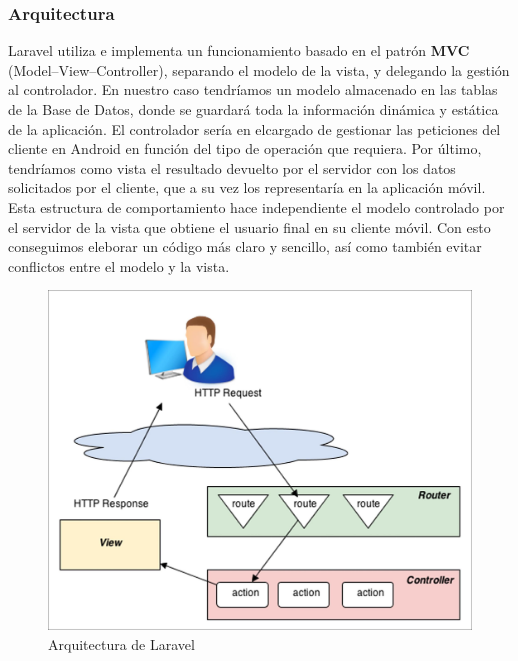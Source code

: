 \subsubsection{Arquitectura}

Laravel utiliza e implementa un funcionamiento basado en el patrón \textbf{MVC} (Model–View–Controller), separando el modelo de la vista, y delegando la gestión al controlador. En nuestro caso tendríamos un modelo almacenado en las tablas de la Base de Datos, donde se guardará toda la información dinámica y estática de la aplicación. El controlador sería en elcargado de gestionar las peticiones del cliente en Android en función del tipo de operación que requiera. Por último, tendríamos como vista el resultado devuelto por el servidor con los datos solicitados por el cliente, que a su vez los representaría en la aplicación móvil. Esta estructura de comportamiento hace independiente el modelo controlado por el servidor de la vista que obtiene el usuario final en su cliente móvil. Con esto conseguimos eleborar un código más claro y sencillo, así como también evitar conflictos entre el modelo y la vista.

\begin{figure}[H]
\centering
\includegraphics[keepaspectratio, scale=0.8]{Media/Captures/laravelArch.jpg}
\caption{Arquitectura de Laravel}
\label{fig:laravelArch}
\end{figure}

